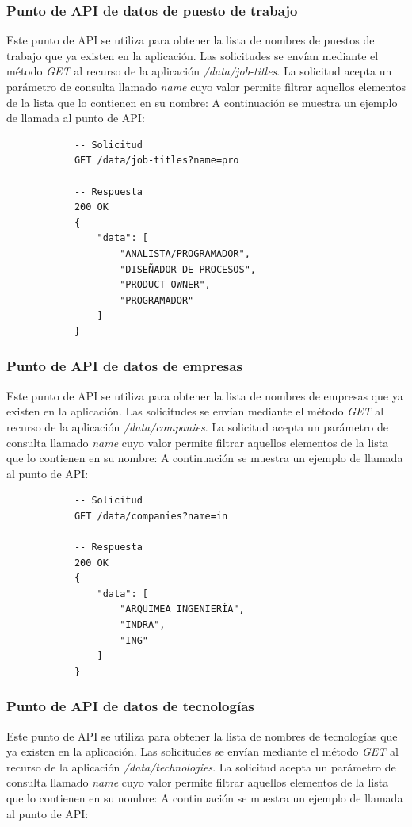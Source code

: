 \documentclass[a4paper, 12pt]{book}
\begin{document}
    \subsubsection{Punto de API de datos de puesto de trabajo}
    \label{subsec:get_data_job_titles}
    Este punto de API se utiliza para obtener la lista de nombres de puestos de trabajo que ya existen en la aplicación.
    Las solicitudes se envían mediante el método \emph{GET} al recurso de la aplicación \emph{/data/job-titles}.
    La solicitud acepta un parámetro de consulta llamado \emph{name} cuyo valor permite filtrar aquellos elementos de la lista que lo contienen en su nombre:
    A continuación se muestra un ejemplo de llamada al punto de API:

        {\scriptsize
    \linespread{1}
    \begin{verbatim}
			-- Solicitud
			GET /data/job-titles?name=pro

			-- Respuesta
			200 OK
			{
			    "data": [
			        "ANALISTA/PROGRAMADOR",
			        "DISEÑADOR DE PROCESOS",
			        "PRODUCT OWNER",
			        "PROGRAMADOR"
			    ]
			}
    \end{verbatim}
    }

    \subsubsection{Punto de API de datos de empresas}
    \label{subsec:get_data_companies}
    Este punto de API se utiliza para obtener la lista de nombres de empresas que ya existen en la aplicación.
    Las solicitudes se envían mediante el método \emph{GET} al recurso de la aplicación \emph{/data/companies}.
    La solicitud acepta un parámetro de consulta llamado \emph{name} cuyo valor permite filtrar aquellos elementos de la lista que lo contienen en su nombre:
    A continuación se muestra un ejemplo de llamada al punto de API:

        {\scriptsize
    \linespread{1}
    \begin{verbatim}
			-- Solicitud
			GET /data/companies?name=in

			-- Respuesta
			200 OK
			{
			    "data": [
			        "ARQUIMEA INGENIERÍA",
			        "INDRA",
			        "ING"
			    ]
			}
    \end{verbatim}
    }

    \subsubsection{Punto de API de datos de tecnologías}
    \label{subsec:get_data_job_technologies}
    Este punto de API se utiliza para obtener la lista de nombres de tecnologías que ya existen en la aplicación.
    Las solicitudes se envían mediante el método \emph{GET} al recurso de la aplicación \emph{/data/technologies}.
    La solicitud acepta un parámetro de consulta llamado \emph{name} cuyo valor permite filtrar aquellos elementos de la lista que lo contienen en su nombre:
    A continuación se muestra un ejemplo de llamada al punto de API:
\end{document}
